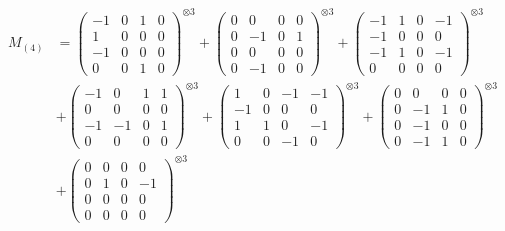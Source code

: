 \documentclass{article}
\newcommand{\Mthree}{%
    M_{(4)}
}
\begin{document}
        \newpage
        
        \footnotesize{
        \begin{align}
        \Mthree
        &= \label{Rs12-Rc12-Solution-1-c1} \begin{pmatrix} -1 & 0 & 1 & 0 \\ 1 & 0 & 0 & 0 \\ -1 & 0 & 0 & 0 \\ 0 & 0 & 1 & 0 \end{pmatrix}^{\otimes 3} 
            + \begin{pmatrix} 0 & 0 & 0 & 0 \\ 0 & -1 & 0 & 1 \\ 0 & 0 & 0 & 0 \\ 0 & -1 & 0 & 0 \end{pmatrix}^{\otimes 3} 
            + \begin{pmatrix} -1 & 1 & 0 & -1 \\ -1 & 0 & 0 & 0 \\ -1 & 1 & 0 & -1 \\ 0 & 0 & 0 & 0 \end{pmatrix}^{\otimes 3} \\
        &+ \label{Rs12-Rc12-Solution-1-c4} \begin{pmatrix} -1 & 0 & 1 & 1 \\ 0 & 0 & 0 & 0 \\ -1 & -1 & 0 & 1 \\ 0 & 0 & 0 & 0 \end{pmatrix}^{\otimes 3} 
            + \begin{pmatrix} 1 & 0 & -1 & -1 \\ -1 & 0 & 0 & 0 \\ 1 & 1 & 0 & -1 \\ 0 & 0 & -1 & 0 \end{pmatrix}^{\otimes 3} 
            + \begin{pmatrix} 0 & 0 & 0 & 0 \\ 0 & -1 & 1 & 0 \\ 0 & -1 & 0 & 0 \\ 0 & -1 & 1 & 0 \end{pmatrix}^{\otimes 3} \\
        &+ \label{Rs12-Rc12-Solution-1-c7} \begin{pmatrix} 0 & 0 & 0 & 0 \\ 0 & 1 & 0 & -1 \\ 0 & 0 & 0 & 0 \\ 0 & 0 & 0 & 0 \end{pmatrix}^{\otimes 3} 

\end{align}}
\end{document}
